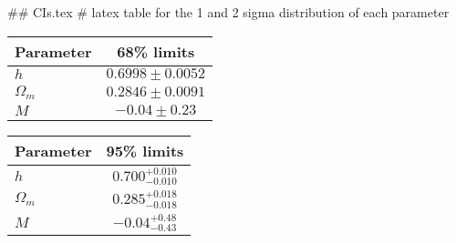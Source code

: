 ## CIs.tex
# latex table for the 1 and 2 sigma distribution of each parameter

\begin{tabular} { l  c}
 Parameter &  68\% limits\\
\hline
{\boldmath$h              $} & $0.6998\pm 0.0052          $\\
{\boldmath$\Omega_m       $} & $0.2846\pm 0.0091          $\\
{\boldmath$M              $} & $-0.04\pm 0.23             $\\
\hline
\end{tabular}

\begin{tabular} { l  c}
 Parameter &  95\% limits\\
\hline
{\boldmath$h              $} & $0.700^{+0.010}_{-0.010}   $\\
{\boldmath$\Omega_m       $} & $0.285^{+0.018}_{-0.018}   $\\
{\boldmath$M              $} & $-0.04^{+0.48}_{-0.43}     $\\
\hline
\end{tabular}
